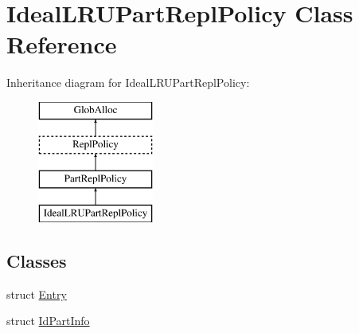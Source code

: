 \hypertarget{classIdealLRUPartReplPolicy}{\section{Ideal\-L\-R\-U\-Part\-Repl\-Policy Class Reference}
\label{classIdealLRUPartReplPolicy}
}
Inheritance diagram for Ideal\-L\-R\-U\-Part\-Repl\-Policy\-:\begin{figure}[H]
\begin{center}
\leavevmode
\includegraphics[height=4.000000cm]{classIdealLRUPartReplPolicy}
\end{center}
\end{figure}
\subsection*{Classes}
\begin{DoxyCompactItemize}
\item 
struct \hyperlink{structIdealLRUPartReplPolicy_1_1Entry}{Entry}
\item 
struct \hyperlink{structIdealLRUPartReplPolicy_1_1IdPartInfo}{Id\-Part\-Info}
\end{DoxyCompactItemize}
